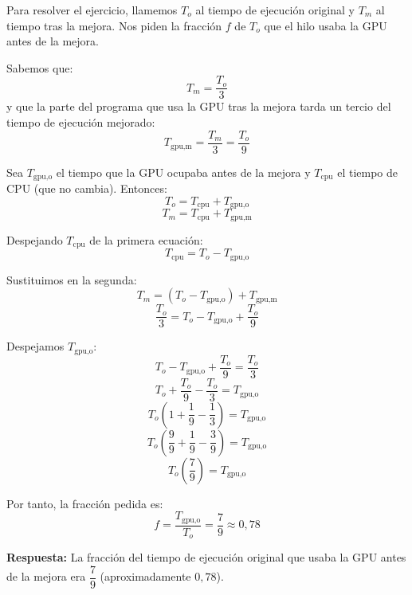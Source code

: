 \documentclass[a4paper,12pt]{article}
\begin{document}
Para resolver el ejercicio, llamemos $T_o$ al tiempo de ejecución original y $T_m$ al tiempo tras la mejora. Nos piden la fracción $f$ de $T_o$ que el hilo usaba la GPU antes de la mejora.

Sabemos que:
\[
T_m = \frac{T_o}{3}
\]
y que la parte del programa que usa la GPU tras la mejora tarda un tercio del tiempo de ejecución mejorado:
\[
T_{\text{gpu,m}} = \frac{T_m}{3} = \frac{T_o}{9}
\]

Sea $T_{\text{gpu,o}}$ el tiempo que la GPU ocupaba antes de la mejora y $T_{\text{cpu}}$ el tiempo de CPU (que no cambia). Entonces:
\[
T_o = T_{\text{cpu}} + T_{\text{gpu,o}}
\]
\[
T_m = T_{\text{cpu}} + T_{\text{gpu,m}}
\]

Despejando $T_{\text{cpu}}$ de la primera ecuación:
\[
T_{\text{cpu}} = T_o - T_{\text{gpu,o}}
\]

Sustituimos en la segunda:
\[
T_m = (T_o - T_{\text{gpu,o}}) + T_{\text{gpu,m}}
\]
\[
\frac{T_o}{3} = T_o - T_{\text{gpu,o}} + \frac{T_o}{9}
\]

Despejamos $T_{\text{gpu,o}}$:
\[
T_o - T_{\text{gpu,o}} + \frac{T_o}{9} = \frac{T_o}{3}
\]
\[
T_o + \frac{T_o}{9} - \frac{T_o}{3} = T_{\text{gpu,o}}
\]
\[
T_o \left(1 + \frac{1}{9} - \frac{1}{3}\right) = T_{\text{gpu,o}}
\]
\[
T_o \left(\frac{9}{9} + \frac{1}{9} - \frac{3}{9}\right) = T_{\text{gpu,o}}
\]
\[
T_o \left(\frac{7}{9}\right) = T_{\text{gpu,o}}
\]

Por tanto, la fracción pedida es:
\[
f = \frac{T_{\text{gpu,o}}}{T_o} = \frac{7}{9} \approx 0{,}78
\]

\textbf{Respuesta:} La fracción del tiempo de ejecución original que usaba la GPU antes de la mejora era $\boxed{\dfrac{7}{9}}$ (aproximadamente $0{,}78$).
\end{document}
